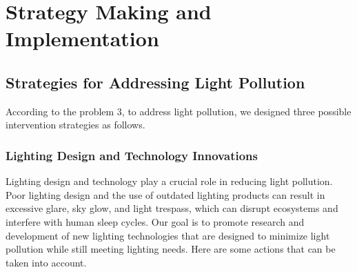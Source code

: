 \MinParskip{}

\section{Strategy Making and Implementation}

\subsection{Strategies for Addressing Light Pollution}

According to the problem 3, to address light pollution, we designed three possible intervention strategies as follows.

\subsubsection{Lighting Design and Technology Innovations}

Lighting design and technology play a crucial role in reducing light pollution. Poor lighting design and the use of outdated lighting products can result in excessive glare, sky glow, and light trespass, which can disrupt ecosystems and interfere with human sleep cycles. Our goal is to promote research and development of new lighting technologies that are designed to minimize light pollution while still meeting lighting needs. Here are some actions that can be taken into account.

